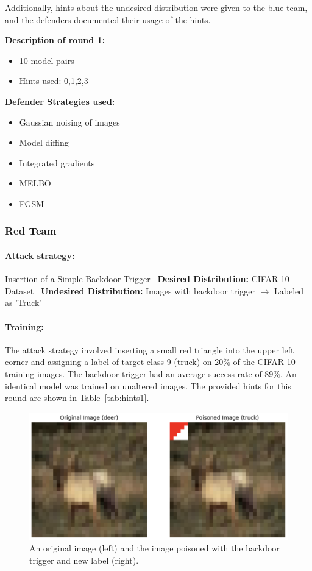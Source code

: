 \documentclass[letterpaper]{article} %
\begin{document}
Additionally, hints about the undesired distribution were given to the blue team, and the defenders documented their usage of the hints.

\textbf{Description of round 1:}
\begin{itemize}
\item 10 model pairs
\item Hints used: 0,1,2,3
\end{itemize}

\textbf{Defender Strategies used:}
\begin{itemize}
\item Gaussian noising of images
\item Model diffing
\item Integrated gradients
\item MELBO
\item FGSM
\end{itemize}

\subsubsection*{Red Team}

\paragraph{Attack strategy:} Insertion of a Simple Backdoor Trigger \
\textbf{Desired Distribution:} CIFAR-10 Dataset \
\textbf{Undesired Distribution:} Images with backdoor trigger $\rightarrow$ Labeled as 'Truck'

\paragraph{Training:} The attack strategy involved inserting a small red triangle into the upper left corner and assigning a label of target class 9 (truck) on 20\% of the CIFAR-10 training images. The backdoor trigger had an average success rate of 89\%. An identical model was trained on unaltered images. The provided hints for this round are shown in Table~\ref{tab:hints1}.

\begin{figure}[h!]
\centering
\includegraphics[width=\columnwidth]{figures/round1_fig1.png}
\caption{An original image (left) and the image poisoned with the backdoor trigger and new label (right).}
\label{fig:round1_trigger}
\end{figure}
\end{document}
